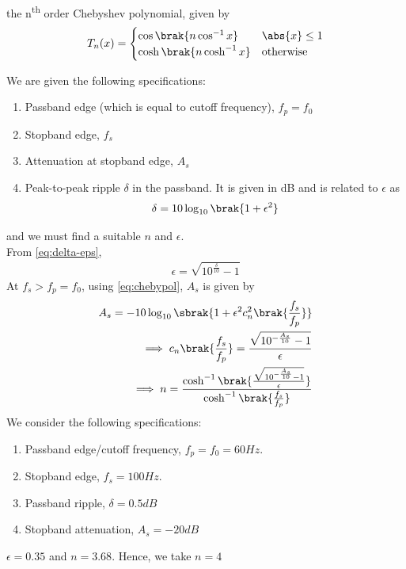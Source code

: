 \documentclass[journal,12pt,twocolumn]{IEEEtran}
\renewcommand\thesection{\arabic{section}}
\begin{document}
\begin{enumerate}[label=\thesection.\arabic*
,ref=\thesection.\theenumi]
\begin{enumerate}
	the n\textsuperscript{th} order Chebyshev polynomial,
	given by
	\begin{align}
		T_n(x) =
		\begin{cases}
			\cos\brak{n\cos^{-1}x} & \abs{x} \le 1 \\
			\cosh\brak{n\cosh^{-1}x} & \textrm{otherwise}
		\end{cases}
		\label{eq:chebypol}
	\end{align}
\end{enumerate}
We are given the following specifications:
\begin{enumerate}
	\item Passband edge (which is equal to 
	cutoff frequency), $f_p = f_0$
	\item Stopband edge, $f_s$
	\item Attenuation at stopband edge, $A_s$
	\item Peak-to-peak ripple $\delta$ in the passband.
	It is given in dB and is related to $\epsilon$ as
	\begin{align}
		\delta = 10\log_{10}\brak{1 + \epsilon^2}
		\label{eq:delta-eps}
	\end{align}
\end{enumerate}
and we must find a suitable $n$ and $\epsilon$.\\
From \eqref{eq:delta-eps},
\begin{align}
	\epsilon = \sqrt{10^{\frac{\delta}{10}} - 1}
	\label{eq:epsilon-del}
\end{align}
At $f_s > f_p = f_0$, using \eqref{eq:chebypol}, $A_s$ is given by
\begin{align}
	A_s = -10\log_{10}\sbrak{1 + \epsilon^2c_n^2\brak{\frac{f_s}{f_p}}} \\
	\implies c_n\brak{\frac{f_s}{f_p}} = \frac{\sqrt{10^{-\frac{A_s}{10}} - 1}}{\epsilon} \\
	\implies n = \frac{\cosh^{-1}\brak{\frac{\sqrt{10^{-\frac{A_s}{10}} - 1}}{\epsilon}}}
	{\cosh^{-1}\brak{\frac{f_s}{f_p}}}
\end{align}
We consider the following specifications:
\begin{enumerate}
	\item Passband edge/cutoff frequency, $f_p = f_0 = {60}{Hz}$.
	\item Stopband edge, $f_s = {100}{Hz}$.
	\item Passband ripple, $\delta = {0.5}{dB}$
	\item Stopband attenuation, $A_s = {-20}{dB}$
\end{enumerate}
$\epsilon = 0.35$ and $n = 3.68$. Hence, we take $n = 4$

\end{enumerate}
\end{document}
